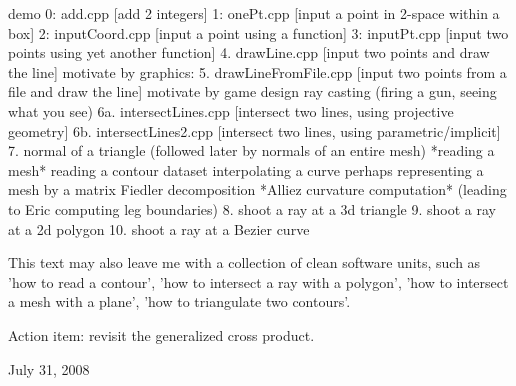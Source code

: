 \documentclass[11pt]{article}
\begin{document}
demo 0: add.cpp [add 2 integers]
     1: onePt.cpp [input a point in 2-space within a box]
     2: inputCoord.cpp [input a point using a function]
     3: inputPt.cpp [input two points using yet another function]
     4. drawLine.cpp [input two points and draw the line]
     motivate by graphics:
     5. drawLineFromFile.cpp [input two points from a file and draw the line]
     motivate by game design ray casting (firing a gun, seeing what you see)
     6a. intersectLines.cpp [intersect two lines, using projective geometry]
     6b. intersectLines2.cpp [intersect two lines, using parametric/implicit]
     7. normal of a triangle (followed later by normals of an entire mesh)
     *reading a mesh*
     reading a contour dataset
     interpolating a curve
     perhaps representing a mesh by a matrix
     Fiedler decomposition
     *Alliez curvature computation* (leading to Eric computing leg boundaries)
     8. shoot a ray at a 3d triangle
     9. shoot a ray at a 2d polygon
     10. shoot a ray at a Bezier curve

This text may also leave me with a collection of clean software units, such
as 'how to read a contour', 'how to intersect a ray with a polygon',
'how to intersect a mesh with a plane', 'how to triangulate two contours'.

Action item: revisit the generalized cross product.

July 31, 2008
\end{document}
